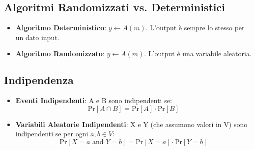 \subsection{Algoritmi Randomizzati vs. Deterministici}
\begin{itemize}
    \item \textbf{Algoritmo Deterministico}: $y \leftarrow A(m)$. L'output è sempre lo stesso per un dato input.
    \item \textbf{Algoritmo Randomizzato}: $y \leftarrow A(m)$. L'output è una variabile aleatoria.
\end{itemize}

\subsection{Indipendenza}
\begin{itemize}
    \item \textbf{Eventi Indipendenti}: A e B sono indipendenti se:
    \[ \text{Pr}[A \cap B] = \text{Pr}[A] \cdot \text{Pr}[B] \]
    \item \textbf{Variabili Aleatorie Indipendenti}: X e Y (che assumono valori in V) sono indipendenti se per ogni $a,b \in V$:
    \[ \text{Pr}[X=a \text{ and } Y=b] = \text{Pr}[X=a] \cdot \text{Pr}[Y=b] \]
\end{itemize}

